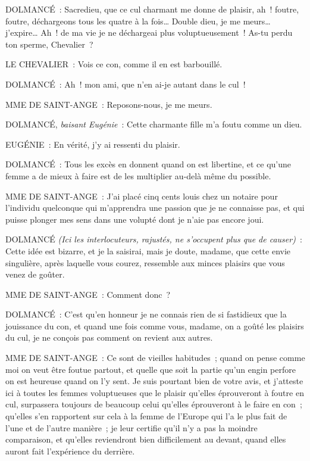 \documentclass[french,twoside]{book} %
\begin{document}
DOLMANCÉ : Sacredieu, que ce cul charmant me donne de plaisir, ah ! foutre, foutre, déchargeons tous les quatre à la fois… Double dieu, je me meurs… j’expire… Ah ! de ma vie je ne déchargeai plus voluptueusement ! As-tu perdu ton sperme, Chevalier ?\par
LE CHEVALIER : Vois ce con, comme il en est barbouillé.\par
DOLMANCÉ : Ah ! mon ami, que n’en ai-je autant dans le cul !\par
MME DE SAINT-ANGE : Reposons-nous, je me meurs.\par
DOLMANCÉ, {\itshape baisant Eugénie} : Cette charmante fille m’a foutu comme un dieu.\par
EUGÉNIE : En vérité, j’y ai ressenti du plaisir.\par
DOLMANCÉ : Tous les excès en donnent quand on est libertine, et ce qu’une femme a de mieux à faire est de les multiplier au-delà même du possible.\par
MME DE SAINT-ANGE : J’ai placé cinq cents louis chez un notaire pour l’individu quelconque qui m’apprendra une passion que je ne connaisse pas, et qui puisse plonger mes sens dans une volupté dont je n’aie pas encore joui.\par
DOLMANCÉ {\itshape (Ici les interlocuteurs, rajustés, ne s’occupent plus que de causer)} : Cette idée est bizarre, et je la saisirai, mais je doute, madame, que cette envie singulière, après laquelle vous courez, ressemble aux minces plaisirs que vous venez de goûter.\par
MME DE SAINT-ANGE : Comment donc ?\par
DOLMANCÉ : C’est qu’en honneur je ne connais rien de si fastidieux que la jouissance du con, et quand une fois comme vous, madame, on a goûté les plaisirs du cul, je ne conçois pas comment on revient aux autres.\par
MME DE SAINT-ANGE : Ce sont de vieilles habitudes ; quand on pense comme moi on veut être foutue partout, et quelle que soit la partie qu’un engin perfore on est heureuse quand on l’y sent. Je suis pourtant bien de votre avis, et j’atteste ici à toutes les femmes voluptueuses que le plaisir qu’elles éprouveront à foutre en cul, surpassera toujours de beaucoup celui qu’elles éprouveront à le faire en con ; qu’elles s’en rapportent sur cela à la femme de l’Europe qui l’a le plus fait de l’une et de l’autre manière ; je leur certifie qu’il n’y a pas la moindre comparaison, et qu’elles reviendront bien difficilement au devant, quand elles auront fait l’expérience du derrière.\par
\end{document}
